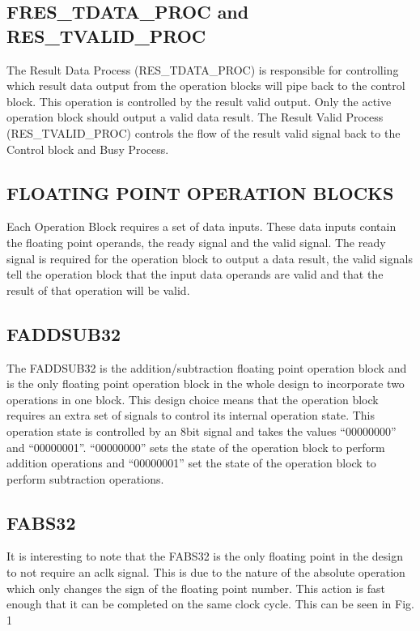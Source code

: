 \documentclass[conference]{IEEEtran}
\begin{document}
\subsection{FRES\_TDATA\_PROC and RES\_TVALID\_PROC}
The Result Data Process (RES\_TDATA\_PROC) is responsible for controlling which result data output from the operation blocks will pipe back to the control block. This operation is controlled by the result valid output. Only the active operation block should output a valid data result. The Result Valid Process (RES\_TVALID\_PROC) controls the flow of the result valid signal back to the Control block and Busy Process.

\subsection{FLOATING POINT OPERATION BLOCKS}
Each Operation Block requires a set of data inputs. These data inputs contain the floating point operands, the ready signal and the valid signal. The ready signal is required for the operation block to output a data result, the valid signals tell the operation block that the input data operands are valid and that the result of that operation will be valid.  

\subsection{FADDSUB32}
The FADDSUB32 is the addition/subtraction floating point operation block and is the only floating point operation block in the whole design to incorporate two operations in one block. This design choice means that the operation block requires an extra set of signals to control its internal operation state. This operation state is controlled by an 8bit signal and takes the values “00000000” and “00000001”. “00000000” sets the state of the operation block to perform addition operations and “00000001” set the state of the operation block to perform subtraction operations. 

\subsection{FABS32}
It is interesting to note that the FABS32 is the only floating point in the design to not require an aclk signal. This is due to the nature of the absolute operation which only changes the sign of the floating point number. This action is fast enough that it can be completed on the same clock cycle. This can be seen in Fig. 1
\end{document}
